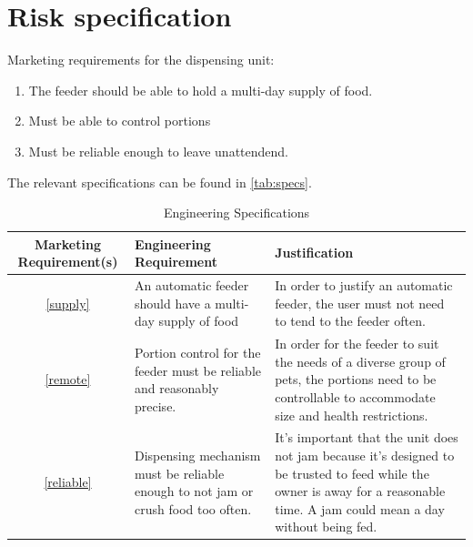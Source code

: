 \documentclass[12pt]{article}
\newcounter{engineering}
\begin{document}
\section{Risk specification}
Marketing requirements for the dispensing unit:

\begin{enumerate}
    \item\label{supply} The feeder should be able to hold a multi-day supply of food.
    \item\label{remote} Must be able to control portions
    \item\label{reliable} Must be reliable enough to leave unattendend.
\end{enumerate}
The relevant specifications can be found in \autoref{tab:specs}.

\begin{table}[H]
    \centering
    \caption{Engineering Specifications}
    \label{tab:specs}
    \begin{tabularx}{\linewidth}{cXX} \toprule
        Marketing Requirement(s) & Engineering Requirement & Justification \\ \midrule
        \ref{supply}             &  An automatic feeder should have a multi-day supply of food & In order to justify an automatic feeder, the user must not need to tend to the feeder often.\\
        \ref{remote}              & Portion control for the feeder must be reliable and reasonably precise. & In order for the feeder to suit the needs of a diverse group of pets, the portions need to be controllable to accommodate size and health restrictions. \\
        \ref{reliable}            & Dispensing mechanism must be reliable enough to not jam or crush food too often.& It’s important that the unit does not jam because it’s designed to be trusted to feed while the owner is away for a reasonable time. A jam could mean a day without being fed.\\
    \end{tabularx}
\end{table}

\end{document}
